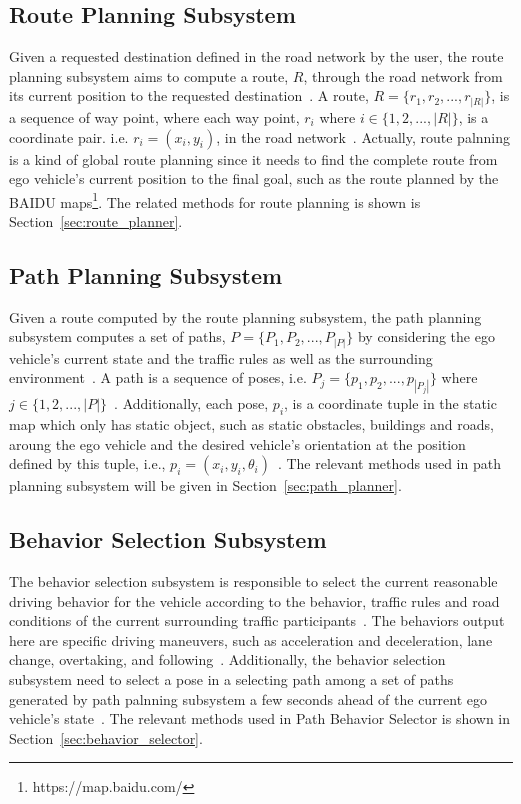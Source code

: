 \documentclass[conference]{IEEEtran}
\begin{document}
\subsection{Route Planning Subsystem}
Given a requested destination defined in the road network by the user, the route planning subsystem aims to compute a route, $R$, through the road network from its current position to the requested destination~\cite{Brian2016}. A route, $R=\{r_1, r_2,...,r_{|R|}\}$, is a sequence of way point, where each way point, $r_i$ where $i \in \{1,2,...,|R|\}$, is a coordinate pair. i.e. $r_i = (x_i, y_i)$, in the road network~\cite{self_driving}. Actually, route palnning is a kind of global route planning since it needs to find the complete route from ego vehicle's current position to the final goal, such as the route planned by the BAIDU maps\footnote{https://map.baidu.com/}. The related methods for route planning is shown is Section~\ref{sec:route_planner}.

\subsection{Path Planning Subsystem}
Given a route computed by the route planning subsystem, the path planning subsystem computes a set of paths, $P=\{P_1, P_2, ..., P_{|P|}\}$ by considering the ego vehicle's current state and the traffic rules as well as the surrounding environment~\cite{self_driving}. A path is a sequence of poses, i.e. $P_j=\{p_1, p_2, ..., p_{|P_j|}\}$ where $j \in \{1, 2,...,|P|\}$~\cite{self_driving}. Additionally, each pose, $p_i$, is a coordinate tuple in the static map which only has static object, such as static obstacles, buildings and roads, aroung the ego vehicle and the desired vehicle's orientation at the position defined by this tuple, i.e., $p_i=(x_i, y_i, \theta_i)$~\cite{self_driving}. The relevant methods used in path planning subsystem will be given in Section~\ref{sec:path_planner}.

\subsection{Behavior Selection Subsystem}
The behavior selection subsystem is responsible to select the current reasonable driving behavior for the vehicle according to the behavior, traffic rules and road conditions of the current surrounding traffic participants~\cite{Brian2016}. The behaviors output here are specific driving maneuvers, such as acceleration and deceleration, lane change, overtaking, and following~\cite{Brian2016}. Additionally, the behavior selection subsystem need to select a pose in a selecting path among a set of paths generated by path palnning subsystem a few seconds ahead of the current ego vehicle's state~\cite{self_driving}. The relevant methods used in Path Behavior Selector is shown in Section~\ref{sec:behavior_selector}.
\end{document}
